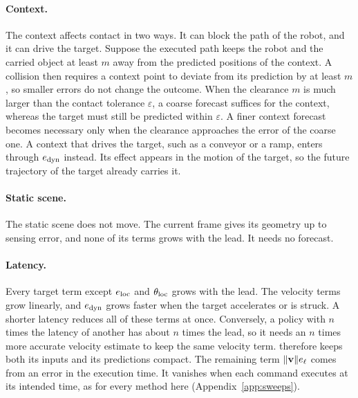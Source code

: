\paragraph{Context.}
The context affects contact in two ways. It can block the path of the robot, and it can
drive the target. Suppose the executed path keeps the robot and the carried object at
least $m$ away from the predicted positions of the context. A collision then requires a
context point to deviate from its prediction by at least $m$, so smaller errors do not
change the outcome. When the clearance $m$ is much larger than the contact tolerance
$\varepsilon$, a coarse forecast suffices for the context, whereas the target must still
be predicted within $\varepsilon$. A finer context forecast becomes necessary only when
the clearance approaches the error of the coarse one. A context that drives the target,
such as a conveyor or a ramp, enters through $e_{\rm dyn}$ instead. Its effect appears in
the motion of the target, so the future trajectory of the target already carries it.

\paragraph{Static scene.}
The static scene does not move. The current frame gives its geometry up to sensing
error, and none of its terms grows with the lead. It needs no forecast.

\paragraph{Latency.}
Every target term except $e_{\rm loc}$ and $\theta_{\rm loc}$ grows with the lead. The
velocity terms grow linearly, and $e_{\rm dyn}$ grows faster when the target
accelerates or is struck. A shorter latency reduces all of these terms at once. Conversely,
a policy with $n$ times the latency of another has about $n$ times the lead, so it needs
an $n$ times more accurate velocity estimate to keep the same velocity term.
\ours therefore keeps both its inputs and its predictions compact. The remaining
term $\|\mathbf{v}\|e_\ell$ comes from an error in the execution time. It vanishes when each command executes at its intended time, as for every method here (Appendix~\ref{app:sweeps}).

